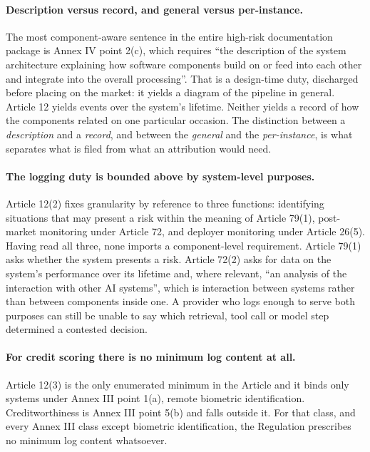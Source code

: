 \documentclass[11pt]{article}
\theoremstyle{remark}
\begin{document}
\paragraph{Description versus record, and general versus per-instance.} The most
component-aware sentence in the entire high-risk documentation package is Annex
IV point 2(c), which requires ``the description of the system architecture
explaining how software components build on or feed into each other and integrate
into the overall processing''. That is a design-time duty, discharged before
placing on the market: it yields a diagram of the pipeline in general. Article 12
yields events over the system's lifetime. Neither yields a record of how the
components related on one particular occasion. The distinction between a
\emph{description} and a \emph{record}, and between the \emph{general} and the
\emph{per-instance}, is what separates what is filed from what an attribution
would need.

\paragraph{The logging duty is bounded above by system-level purposes.} Article
12(2) fixes granularity by reference to three functions: identifying situations
that may present a risk within the meaning of Article 79(1), post-market
monitoring under Article 72, and deployer monitoring under Article 26(5). Having
read all three, none imports a component-level requirement. Article 79(1) asks
whether the system presents a risk. Article 72(2) asks for data on the system's
performance over its lifetime and, where relevant, ``an analysis of the
interaction with other AI systems'', which is interaction between systems rather
than between components inside one. A provider who logs enough to serve both
purposes can still be unable to say which retrieval, tool call or model step
determined a contested decision.

\paragraph{For credit scoring there is no minimum log content at all.} Article
12(3) is the only enumerated minimum in the Article and it binds only systems
under Annex III point 1(a), remote biometric identification. Creditworthiness is
Annex III point 5(b) and falls outside it. For that class, and every Annex III
class except biometric identification, the Regulation prescribes no minimum log
content whatsoever.
\end{document}

